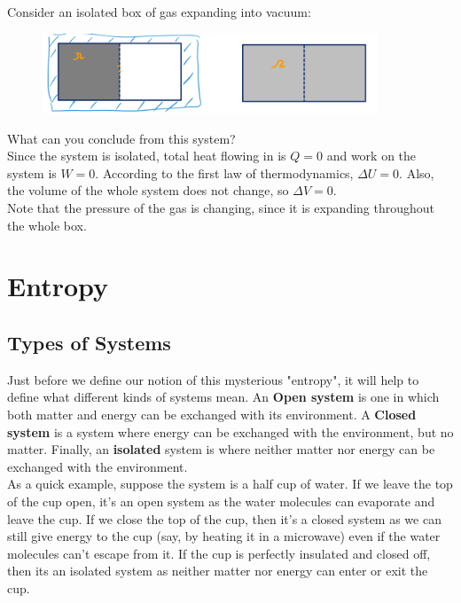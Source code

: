 \documentclass[12pt, a4paper]{article}
\newcounter{exa}
\begin{document}
\begin{texample}
Consider an isolated box of gas expanding into vacuum:

\begin{figure}[H]
\centering
\includegraphics[width=100mm]{31.png}
\end{figure}

What can you conclude from this system? \\

Since the system is isolated, total heat flowing in is $Q=0$ and work on the system is $W=0$. According to the first law of thermodynamics, $\Delta U=0$. Also, the volume of the whole system does not change, so $\Delta V=0$. \\

Note that the pressure of the gas is changing, since it is expanding throughout the whole box.
\end{texample}

\section{Entropy}

\subsection{Types of Systems}
Just before we define our notion of this mysterious "entropy", it will help to define what different kinds of systems mean. An \textbf{Open system} is one in which both matter and energy can be exchanged with its environment. A \textbf{Closed system} is a system where energy can be exchanged with the environment, but no matter. Finally, an \textbf{isolated} system is where neither matter nor energy can be exchanged with the environment. \\

As a quick example, suppose the system is a half cup of water. If we leave the top of the cup open, it's an open system as the water molecules can evaporate and leave the cup. If we close the top of the cup, then it's a closed system as we can still give energy to the cup (say, by heating it in a microwave) even if the water molecules can't escape from it. If the cup is perfectly insulated and closed off, then its an isolated system as neither matter nor energy can enter or exit the cup.
\end{document}
